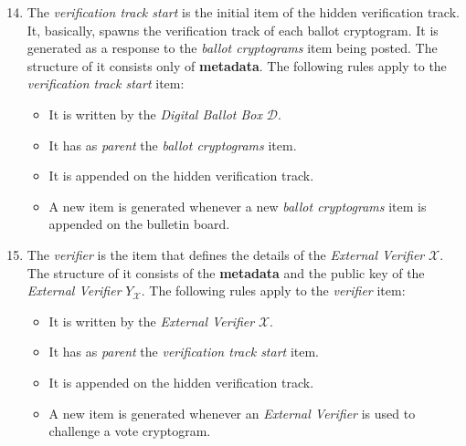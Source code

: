\begin{enumerate}
    \setcounter{enumi}{13}
    \item
        The \textit{verification track start} is the initial item of the hidden verification track. It, basically, spawns the verification track of each ballot cryptogram. It is generated as a response to the \textit{ballot cryptograms} item being posted.  The structure of it consists only of \textbf{metadata}. The following rules apply to the \textit{verification track start} item:
        \begin{itemize}
            \item It is written by the \textit{Digital Ballot Box} $\mathcal{D}$.
            \item It has as \textit{parent} the \textit{ballot cryptograms} item.
            \item It is appended on the hidden verification track.
            \item A new item is generated whenever a new \textit{ballot cryptograms} item is appended on the bulletin board.
        \end{itemize}
    
    \item
        The \textit{verifier} is the item that defines the details of the \textit{External Verifier} $\mathcal{X}$. The structure of it consists of the \textbf{metadata} and the public key of the \textit{External Verifier} $Y_\mathcal{X}$. The following rules apply to the \textit{verifier} item:
        \begin{itemize}
            \item It is written by the \textit{External Verifier} $\mathcal{X}$.
            \item It has as \textit{parent} the \textit{verification track start} item.
            \item It is appended on the hidden verification track.
            \item A new item is generated whenever an \textit{External Verifier} is used to challenge a vote cryptogram.
        \end{itemize}
    

\end{enumerate}
